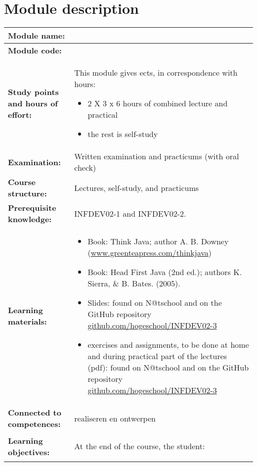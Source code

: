 \section*{Module description}
\begin{tabularx}{\textwidth}{|>{\columncolor{lichtGrijs}} p{}|X|}
	\hline
	\textbf{Module name:} & \modulenaam\\

	\hline
	\textbf{Module code: }& \modulecode\\
	\hline
	\textbf{Study points \newline and hours of effort:} & This module gives \stdPunten{}  ects, in correspondence with \FPeval{\result}{clip(\stdPunten*28)}\result{} hours:
	\begin{itemize}
		\item 2 X 3 x 6 hours of combined lecture and practical
		\item the rest is self-study
	\end{itemize} \\
	\hline
	\textbf{Examination:} & Written examination and practicums (with oral check) \\
	\hline
	\textbf{Course structure:} & Lectures, self-study, and practicums \\
	\hline
	\textbf{Prerequisite knowledge:} & INFDEV02-1 and INFDEV02-2. \\
	\hline
	\textbf{Learning materials:}  &
		\begin{itemize}
			\item Book: Think Java; author A. B. Downey (\href{http://www.greenteapress.com/thinkjava/}{www.greenteapress.com/thinkjava})
			\item Book: Head First Java (2nd ed.); authors K. Sierra, \& B. Bates. (2005).
			\item Slides: found on N@tschool and on the GitHub repository \href{https://github.com/hogeschool/INFDEV02-3}{github.com/hogeschool/INFDEV02-3}
			\item \Glspl{exercise} and \glspl{assignment}, to be done at home and during practical part of the lectures (pdf): found on N@tschool and on the GitHub repository \href{https://github.com/hogeschool/INFDEV02-3}{github.com/hogeschool/INFDEV02-3}
		\end{itemize} \\
	\hline
	\textbf{Connected to competences:} & realiseren en ontwerpen \\
	\hline
	\textbf{Learning objectives:} &
		At the end of the course, the student:
			\begin{itemize}

\end{itemize}
\end{tabularx}
